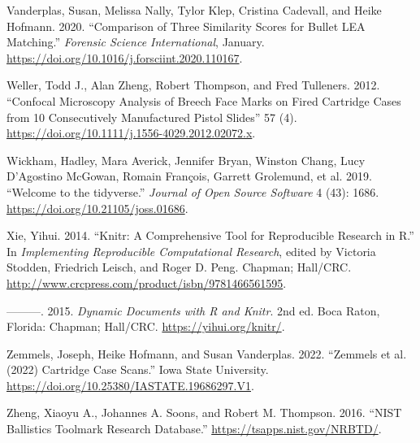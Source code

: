 \begin{CSLReferences}{1}{0}
\leavevmode{}%
Vanderplas, Susan, Melissa Nally, Tylor Klep, Cristina Cadevall, and Heike Hofmann. 2020. {``Comparison of Three Similarity Scores for Bullet {LEA} Matching.''} \emph{Forensic Science International}, January. \url{https://doi.org/10.1016/j.forsciint.2020.110167}.

\leavevmode{}%
Weller, Todd J., Alan Zheng, Robert Thompson, and Fred Tulleners. 2012. {``Confocal Microscopy Analysis of Breech Face Marks on Fired Cartridge Cases from 10 Consecutively Manufactured Pistol Slides''} 57 (4). \url{https://doi.org/10.1111/j.1556-4029.2012.02072.x}.

\leavevmode{}%
Wickham, Hadley, Mara Averick, Jennifer Bryan, Winston Chang, Lucy D'Agostino McGowan, Romain François, Garrett Grolemund, et al. 2019. {``Welcome to the {tidyverse}.''} \emph{Journal of Open Source Software} 4 (43): 1686. \url{https://doi.org/10.21105/joss.01686}.

\leavevmode{}%
Xie, Yihui. 2014. {``Knitr: A Comprehensive Tool for Reproducible Research in {R}.''} In \emph{Implementing Reproducible Computational Research}, edited by Victoria Stodden, Friedrich Leisch, and Roger D. Peng. Chapman; Hall/CRC. \url{http://www.crcpress.com/product/isbn/9781466561595}.

\leavevmode{}%
---------. 2015. \emph{Dynamic Documents with {R} and Knitr}. 2nd ed. Boca Raton, Florida: Chapman; Hall/CRC. \url{https://yihui.org/knitr/}.

\leavevmode{}%
Zemmels, Joseph, Heike Hofmann, and Susan Vanderplas. 2022. {``{Zemmels et al. (2022) Cartridge Case Scans}.''} Iowa State University. \url{https://doi.org/10.25380/IASTATE.19686297.V1}.

\leavevmode{}%
Zheng, Xiaoyu A., Johannes A. Soons, and Robert M. Thompson. 2016. {``{NIST Ballistics Toolmark Research Database}.''} \url{https://tsapps.nist.gov/NRBTD/}.

\end{CSLReferences}



\address{%
Joseph Zemmels\\
Center for Statistics and Applications in Forensic Evidence\\%
Department of Statistics\\ Iowa State University\\ 2438 Osborn Drive\\ Ames, IA 50011\\
%
%
%
\href{mailto:jzemmels@iastate.edu}{\nolinkurl{jzemmels@iastate.edu}}%
}

